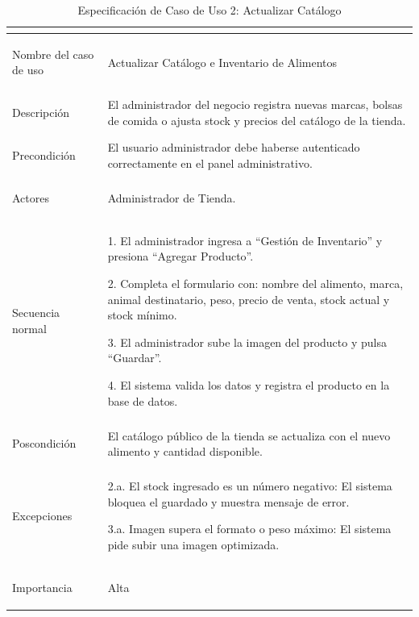 \newpage
\begin{table}[H]
    \centering
    \small
    \renewcommand{\arraystretch}{1.4}
    \begin{tabularx}{\textwidth}{|>{\bfseries\raggedright\arraybackslash}p{4cm}|L|}
        \hline
          \\
        \hline
        Nombre del caso de uso & Actualizar Catálogo e Inventario de Alimentos \\
        \hline
        Descripción & El administrador del negocio registra nuevas marcas, bolsas de comida o ajusta stock y precios del catálogo de la tienda. \\
        \hline
        Precondición & El usuario administrador debe haberse autenticado correctamente en el panel administrativo. \\
        \hline
        Actores & Administrador de Tienda. \\
        \hline
        Secuencia normal & 
        1. El administrador ingresa a ``Gestión de Inventario'' y presiona ``Agregar Producto''. \par
        2. Completa el formulario con: nombre del alimento, marca, animal destinatario, peso, precio de venta, stock actual y stock mínimo. \par
        3. El administrador sube la imagen del producto y pulsa ``Guardar''. \par
        4. El sistema valida los datos y registra el producto en la base de datos. \\
        \hline
        Poscondición & El catálogo público de la tienda se actualiza con el nuevo alimento y cantidad disponible. \\
        \hline
        Excepciones & 
        2.a. El stock ingresado es un número negativo: El sistema bloquea el guardado y muestra mensaje de error. \par
        3.a. Imagen supera el formato o peso máximo: El sistema pide subir una imagen optimizada. \\
        \hline
        Importancia & Alta \\
        \hline
    \end{tabularx}
    \caption{Especificación de Caso de Uso 2: Actualizar Catálogo}
    \label{tab:especificacion_cu2}
\end{table}

